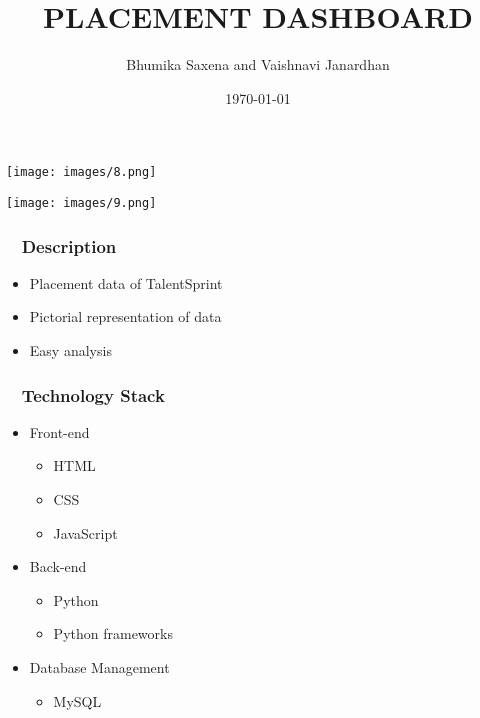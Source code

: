\documentclass[xcolor={dvipsnames}]{beamer}
\title[Placement Dashboard]{PLACEMENT DASHBOARD}
\author[Bhumika, Vaishnavi]{Bhumika Saxena and Vaishnavi Janardhan}
\institute{TalentSprint WE}
\date{\today}
\begin{document}
\begin{frame}[plain]
\begin{center}
\texttt{[image: images/8.png]}
\end{center}
\end{frame}

\begin{frame}[plain]
\begin{center}
\texttt{[image: images/9.png]}
\end{center}
\end{frame}


\begin{frame}
\titlepage %
\end{frame}


\begin{frame}
\frametitle{~ Description}
\begin {itemize}
\item{Placement data of TalentSprint}
\item{Pictorial representation of data}
\item{Easy analysis}
\end{itemize}
\end{frame}

\begin{frame}
\frametitle{ ~ Technology Stack} 
\begin {itemize}
\item Front-end
    \begin {itemize}
        \item{HTML} 
        \item{CSS}
        \item{JavaScript}
    \end{itemize}
\bigskip 
\item Back-end
    \begin {itemize}
        \item{Python} 
        \item{Python frameworks}
    \end{itemize}
\bigskip 
\item Database Management
    \begin {itemize}
        \item{MySQL}
    \end{itemize}
\end{itemize}
\end{frame}
\end{document}
